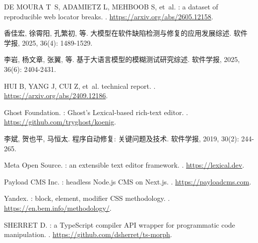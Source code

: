 \documentclass[UTF8, a4paper, 10.5pt, twocolumn, fontset=none]{ctexart}
\begin{document}
\begin{thebibliography}{18}
{DE MOURA} T~S, ADAMIETZ L, MEHBOOB S, et~al.
: a dataset of reproducible web locator
  breaks\allowbreak[EB/OL].
\allowbreak[2026-06-20].
\newblock \url{https://arxiv.org/abs/2605.12158}.

香佳宏, 徐霄阳, 孔繁初, 等.
\newblock
  大模型在软件缺陷检测与修复的应用发展综述\allowbreak[J].
\newblock 软件学报, 2025, 36\allowbreak (4): 1489-1529.

李岩, 杨文章, 张翼, 等.
\newblock 基于大语言模型的模糊测试研究综述\allowbreak[J].
\newblock 软件学报, 2025, 36\allowbreak (6): 2404-2431.

HUI B, YANG J, CUI Z, et~al.
 technical report\allowbreak[EB/OL].
\allowbreak[2026-06-20].
\newblock \url{https://arxiv.org/abs/2409.12186}.

{Ghost Foundation}.
: {Ghost}'s {Lexical}-based rich-text
  editor\allowbreak[EB/OL].
\allowbreak[2026-06-20].
\newblock \url{https://github.com/tryghost/koenig}.

李斌, 贺也平, 马恒太.
\newblock 程序自动修复: 关键问题及技术\allowbreak[J].
\newblock 软件学报, 2019, 30\allowbreak (2): 244-265.

{Meta Open Source}.
: an extensible text editor framework\allowbreak[EB/OL].
\allowbreak[2026-06-20].
\newblock \url{https://lexical.dev}.

{Payload CMS Inc.}
: headless {Node.js} {CMS} on
  {Next.js}\allowbreak[EB/OL].
\allowbreak[2026-06-20].
\newblock \url{https://payloadcms.com}.

{Yandex}.
: block, element, modifier {CSS} methodology\allowbreak[EB/OL].
\allowbreak[2026-06-20].
\newblock \url{https://en.bem.info/methodology/}.

SHERRET D.
: a {TypeScript} compiler {API} wrapper for programmatic
  code manipulation\allowbreak[EB/OL].
\allowbreak[2026-06-20].
\newblock \url{https://github.com/dsherret/ts-morph}.


\end{thebibliography}
\end{document}
